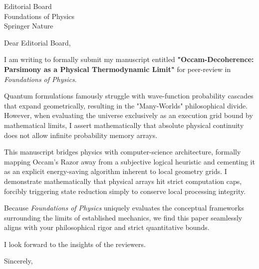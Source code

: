 \documentclass[11pt,a4paper]{letter}
\begin{document}
\begin{letter}{Editorial Board \\ Foundations of Physics \\ Springer Nature}

\opening{Dear Editorial Board,}

I am writing to formally submit my manuscript entitled \textbf{"Occam-Decoherence: Parsimony as a Physical Thermodynamic Limit"} for peer-review in \textit{Foundations of Physics}.

Quantum formulations famously struggle with wave-function probability cascades that expand geometrically, resulting in the "Many-Worlds" philosophical divide. However, when evaluating the universe exclusively as an execution grid bound by mathematical limits, I assert mathematically that absolute physical continuity does not allow infinite probability memory arrays.

This manuscript bridges physics with computer-science architecture, formally mapping Occam’s Razor away from a subjective logical heuristic and cementing it as an explicit energy-saving algorithm inherent to local geometry grids. I demonstrate mathematically that physical arrays hit strict computation caps, forcibly triggering state reduction simply to conserve local processing integrity.

Because \textit{Foundations of Physics} uniquely evaluates the conceptual frameworks surrounding the limits of established mechanics, we find this paper seamlessly aligns with your philosophical rigor and strict quantitative bounds.

I look forward to the insights of the reviewers.

\closing{Sincerely,}

\end{letter}
\end{document}
